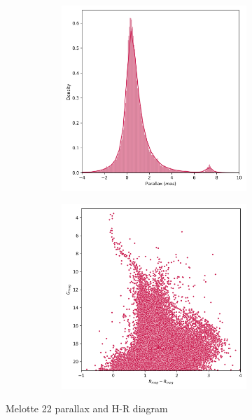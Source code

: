 \documentclass[11pt, a4paper, english]{book}
\begin{document}
\begin{figure}[htbp]
  \centering
  \begin{subfigure}{0.9\textwidth}
    \centering
    \begin{subfigure}[t]{0.45\textwidth}
      \centering
      \includegraphics[width=\textwidth]{../figures/melotte_22/raw_parallax_melotte_22.png}
    \end{subfigure}
    \hfill
    \begin{subfigure}[t]{0.45\textwidth}
      \centering
      \includegraphics[width=\textwidth]{../figures/melotte_22/raw_hr_diagram_melotte_22.png}
    \end{subfigure}
  \end{subfigure}
  \caption{Melotte 22 parallax and H-R diagram}
  \label{fig:raw_parallax_hr_diagram_mellote_22}
\end{figure}
\end{document}
